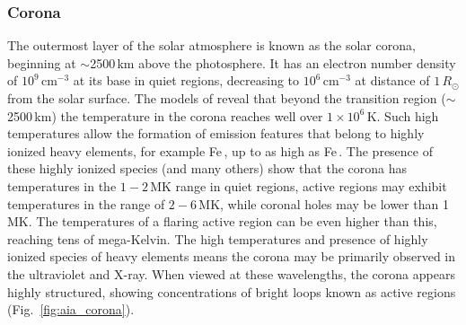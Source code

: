 \subsubsection{Corona}\label{sec:123}

The outermost layer of the solar atmosphere is known as the solar corona, beginning at $\sim$2500\,km above the photosphere. It has an electron number density of $10^{9}$\,cm$^{-3}$ at its base in quiet regions, decreasing to $10^{6}$\,cm$^{-3}$ at distance of $1\,R_{\odot}$ from the solar surface. The models of \citep{vernazza1981, fontenla1988, gabriel1976} reveal that beyond the transition region ($\sim$2500\,km) the temperature in the corona reaches well over $1\times10^{6}$\,K. Such high temperatures allow the formation of emission features that belong to highly ionized heavy elements, for example Fe\,, up to as high as Fe\,. The presence of these highly ionized species (and many others) show that the corona has temperatures in the $1-2$\,MK range in quiet regions, active regions may exhibit temperatures in the range of $2-6$\,MK, while coronal holes may be lower than 1\,MK. The temperatures of a flaring active region can be even higher than this, reaching tens of mega-Kelvin. The high temperatures and presence of highly ionized species of heavy elements means the corona may be primarily observed in the ultraviolet and X-ray. When viewed at these wavelengths, the corona appears highly structured, showing concentrations of bright loops known as active regions (Fig.~\ref{fig:aia_corona}).
